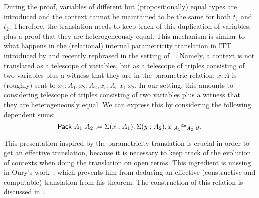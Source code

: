 During the proof, variables of different but (propositionally) equal
types are introduced and the context cannot be maintained to be the same
for both $t_1$ and $t_2$. Therefore, the translation needs to keep
track of this duplication of variables, plus a proof that they are
heterogeneously equal.
%
This mechanism is similar to what happens in the (relational) internal
parametricity translation in \acrshort{ITT} introduced by
 and recently rephrased in the setting of
\MetaCoq~. Namely, a context is not
translated as a telescope of variables, but as a telescope of triples
consisting of two variables plus a witness that they are in the
parametric relation: \(x : A\) is (roughly) sent to
\(x_1 : A_1, x_2 : A_2, x_\varepsilon : A_\varepsilon\ x_1\ x_2\).
%
In our setting, this amounts to considering telescope of triples
consisting of two variables plus a witness that they are
heterogeneously equal. We can express this by considering the
following dependent sums:
\[
\Pack{A_1}{A_2} := \Sum{x:A_1} \Sum{y:A_2} \Heq{A_1}{x}{A_2}{y}.
\]

This presentation inspired by the parametricity translation is crucial
in order to get an effective translation, because it is necessary to
keep track of the evolution of contexts when doing the translation on
open terms.
%
This ingredient is missing in Oury's work~,
which prevents him from deducing an effective (\ie constructive and
computable) translation from his theorem.
The construction of this relation is discussed in .
